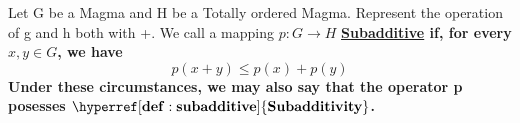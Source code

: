 \label{def:subadditive}
\newcommand{\Subadditive}[0]{
    \bf \hyperref[def:subadditive]{Subadditive} \rm
}

\newcommand{\Subadditivity}[0]{
    \bf \hyperref[def:subadditive]{Subadditivity} \rm
}
\begin{df}[Subadditive]
Let G be a Magma and H be a Totally ordered Magma. Represent the operation of g and h both with +. 
We call a mapping $p:G \to H$ \Subadditive if, for every $x,y \in G$, we have 
\begin{equation}
    p(x+y) \leq p(x)+p(y)
\end{equation}
Under these circumstances, we may also say that the operator p posesses $\Subadditivity$. 
\end{df}
